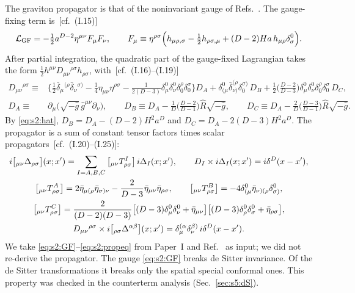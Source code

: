 \documentclass[aps,prd,onecolumn,10pt,nofootinbib,floatfix]{revtex4-2}
\newcommand{\PI}{Paper~I}
\newcommand{\eqI}[1]{(I.#1)}
\begin{document}
The graviton propagator is that of the noninvariant gauge of
Refs.~\cite{ref:Tsamis1994,KW07}. The gauge-fixing term is~[cf.\ \eqI{15}]
\begin{equation}
\mathcal L_{\rm GF}=-\tfrac12a^{D-2}\eta^{\mu\nu}F_\mu F_\nu,\qquad
F_\mu\equiv\eta^{\rho\sigma}\Big(h_{\mu\rho,\sigma}-\tfrac12h_{\rho\sigma,\mu}+(D-2)Ha\,h_{\mu\rho}\delta^0_\sigma\Big).
\label{eq:s2:GF}
\end{equation}
After partial integration, the quadratic part of the gauge-fixed Lagrangian
takes the form $\tfrac12h^{\mu\nu}D_{\mu\nu}{}^{\rho\sigma}h_{\rho\sigma}$,
with~[cf.\ \eqI{16}--\eqI{19}]
\begin{align}
D_{\mu\nu}{}^{\rho\sigma}\equiv{}&\Big\{\tfrac12\bar\delta_\mu{}^{(\rho}\bar\delta_\nu{}^{\sigma)}-\tfrac14\eta_{\mu\nu}\eta^{\rho\sigma}
-\frac{1}{2(D-3)}\delta^0_\mu\delta^0_\nu\delta^\rho_0\delta^\sigma_0\Big\}D_A
+\delta^0_{(\mu}\bar\delta_{\nu)}^{(\rho}\delta^{\sigma)}_0\,D_B
+\frac12\Big(\frac{D-2}{D-3}\Big)\delta^0_\mu\delta^0_\nu\delta^\rho_0\delta^\sigma_0\,D_C,
\label{eq:s2:Dop}\\
D_A\equiv{}&\partial_\mu\big(\sqrt{-\hat g}\,\hat g^{\mu\nu}\partial_\nu\big),\qquad
D_B\equiv D_A-\frac1D\Big(\frac{D-2}{D-1}\Big)\hat R\sqrt{-\hat g},\qquad
D_C\equiv D_A-\frac2D\Big(\frac{D-3}{D-1}\Big)\hat R\sqrt{-\hat g}.
\label{eq:s2:DABC}
\end{align}
By \eqref{eq:s2:hat}, $D_B=D_A-(D-2)H^2a^D$ and $D_C=D_A-2(D-3)H^2a^D$. The
propagator is a sum of constant tensor factors times scalar
propagators~[cf.\ \eqI{20}--\eqI{25}]:
\begin{gather}
i\big[{}_{\mu\nu}\Delta_{\rho\sigma}\big](x;x')=\sum_{I=A,B,C}\big[{}_{\mu\nu}T^I_{\rho\sigma}\big]\,i\Delta_I(x;x'),
\qquad D_I\times i\Delta_I(x;x')=i\delta^D(x-x') ,
\label{eq:s2:hprop}\\
\big[{}_{\mu\nu}T^A_{\rho\sigma}\big]=2\bar\eta_{\mu(\rho}\bar\eta_{\sigma)\nu}-\frac{2}{D-3}\bar\eta_{\mu\nu}\bar\eta_{\rho\sigma},\qquad
\big[{}_{\mu\nu}T^B_{\rho\sigma}\big]=-4\delta^0_{(\mu}\bar\eta_{\nu)(\rho}\delta^0_{\sigma)},
\label{eq:s2:TAB}\\
\big[{}_{\mu\nu}T^C_{\rho\sigma}\big]=\frac{2}{(D-2)(D-3)}\big[(D-3)\delta^0_\mu\delta^0_\nu+\bar\eta_{\mu\nu}\big]\big[(D-3)\delta^0_\rho\delta^0_\sigma+\bar\eta_{\rho\sigma}\big],
\label{eq:s2:TC}\\
D_{\mu\nu}{}^{\rho\sigma}\times i\big[{}_{\rho\sigma}\Delta^{\alpha\beta}\big](x;x')=\delta_\mu^{(\alpha}\delta_\nu^{\beta)}\,i\delta^D(x-x') .
\label{eq:s2:propeq}
\end{gather}
We take \eqref{eq:s2:GF}--\eqref{eq:s2:propeq} from \PI{} and
Ref.~\cite{ref:Tsamis1994} as input; we did not re-derive the propagator.
The gauge \eqref{eq:s2:GF} breaks de Sitter invariance. Of the de Sitter
transformations it breaks only the spatial special conformal ones. This
property was checked in the counterterm analysis (Sec.~\ref{sec:s5:dS}).
\end{document}

